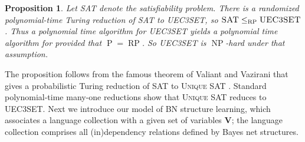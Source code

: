 \documentclass{elsarticle}%
\newtheorem{definition}[theorem]{Definition}
\newtheorem{proposition}[theorem]{Proposition}
\DeclareMathOperator{\Poly}{\mathbf{\mathrm{P}}}
\DeclareMathOperator{\RP}{\mathbf{\mathrm{RP}}}
\DeclareMathOperator{\NP}{\mathbf{\mathrm{NP}}}
\newcommand{\indep}{\ensuremath{\perp{}\!\!\!\!\!\!\!\perp{}}}
\newcommand{\dep}{\ensuremath{{\perp{}\!\!\!\!\!\!\!\not  \perp{}}}}
\renewcommand{\L}{\mathcal{L}}
\newcommand{\D}{\mathcal{D}}
\begin{document}
\begin{proposition}
Let \textsc{SAT} denote the satisfiability problem. There is a randomized polynomial-time Turing reduction of \textsc{SAT} to \textsc{UEC3SET}, so $\textsc{SAT}\leq_{\RP} \textsc{UEC3SET}$. Thus 
a polynomial time algorithm for \textsc{UEC3SET} yields a polynomial time algorithm for  provided that $\Poly=\RP$. So
\textsc{UEC3SET} is $\NP$-hard under that assumption.
\end{proposition}
%
The proposition follows from the famous theorem of Valiant and Vazirani that gives a probabilistic Turing reduction of \textsc{SAT} to \textsc{Unique SAT} \cite{valiant86:_np}. Standard polynomial-time many-one
reductions %
show that \textsc{Unique SAT} reduces to \textsc{UEC3SET}. 
Next we introduce our model of BN structure learning, which associates a language collection %
with
a given set of variables $\mathbf{V}$; %
the language collection %
comprises all (in)dependency relations defined by Bayes net structures.




\end{document}
